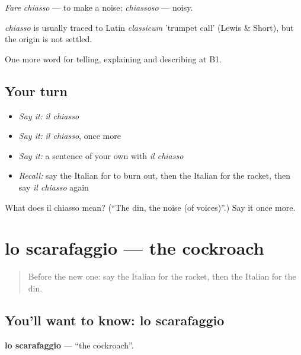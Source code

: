 \emph{Fare chiasso} — to make a noise; \emph{chiassoso} — noisy.

\begin{cousinweb}
\emph{chiasso} is usually traced to Latin \emph{classicum} 'trumpet call' (Lewis \& Short), but the origin is not settled.
\end{cousinweb}

\begin{grammarlens}[title={What you've built}]
One more word for telling, explaining and describing at B1.
\end{grammarlens}

\subsection*{Your turn}
\begin{itemize}
\raggedright
  \item \emph{Say it:} \emph{il chiasso}
  \item \emph{Say it:} \emph{il chiasso}, once more
  \item \emph{Say it:} a sentence of your own with \emph{il chiasso}
  \item \emph{Recall:} say the Italian for to burn out, then the Italian for the racket, then say \emph{il chiasso} again
\end{itemize}

\begin{tcolorbox}[breakable,colback=teal!4,colframe=teal!35!black,title={Before you move on}]
What does il chiasso mean? (\textquotedblleft{}The din, the noise (of voices)\textquotedblright{}.) Say it once more.
\end{tcolorbox}
\section[lo scarafaggio]{lo scarafaggio — the cockroach}

\label{lesson:IT-C437-scarafaggio}



\begin{quote}
Before the new one: say the Italian for the racket, then the Italian for the din.
\end{quote}

\subsection*{You'll want to know: lo scarafaggio}
\textbf{lo scarafaggio} — \textquotedblleft{}the cockroach\textquotedblright{}.

